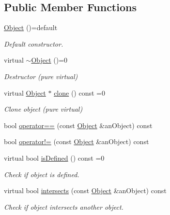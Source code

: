 \subsection*{Public Member Functions}
\begin{DoxyCompactItemize}
\item 
\hyperlink{classlibrary_1_1math_1_1geom_1_1d3_1_1_object_ab484354bbce44290b6d288c7825d9e42}{Object} ()=default
\begin{DoxyCompactList}\small\item\em Default constructor. \end{DoxyCompactList}\item 
virtual \hyperlink{classlibrary_1_1math_1_1geom_1_1d3_1_1_object_addfda217130395f6eeb080a2fe406876}{$\sim$\+Object} ()=0
\begin{DoxyCompactList}\small\item\em Destructor (pure virtual) \end{DoxyCompactList}\item 
virtual \hyperlink{classlibrary_1_1math_1_1geom_1_1d3_1_1_object}{Object} $\ast$ \hyperlink{classlibrary_1_1math_1_1geom_1_1d3_1_1_object_a1a784c6b359e0eb97cd34fabc42f2f3f}{clone} () const =0
\begin{DoxyCompactList}\small\item\em Clone object (pure virtual) \end{DoxyCompactList}\item 
bool \hyperlink{classlibrary_1_1math_1_1geom_1_1d3_1_1_object_a7a68a18bae9709a8cbba5036fd5ad3a0}{operator==} (const \hyperlink{classlibrary_1_1math_1_1geom_1_1d3_1_1_object}{Object} \&an\+Object) const
\item 
bool \hyperlink{classlibrary_1_1math_1_1geom_1_1d3_1_1_object_aebd8708ac1608c0b64ce73b415d5256b}{operator!=} (const \hyperlink{classlibrary_1_1math_1_1geom_1_1d3_1_1_object}{Object} \&an\+Object) const
\item 
virtual bool \hyperlink{classlibrary_1_1math_1_1geom_1_1d3_1_1_object_a2216442e322f0c3ca5f01a4efa22baf7}{is\+Defined} () const =0
\begin{DoxyCompactList}\small\item\em Check if object is defined. \end{DoxyCompactList}\item 
virtual bool \hyperlink{classlibrary_1_1math_1_1geom_1_1d3_1_1_object_a98c37b46f2fdc5f22bc123a757dcf73e}{intersects} (const \hyperlink{classlibrary_1_1math_1_1geom_1_1d3_1_1_object}{Object} \&an\+Object) const
\begin{DoxyCompactList}\small\item\em Check if object intersects another object. \end{DoxyCompactList}\item 

\end{DoxyCompactItemize}
